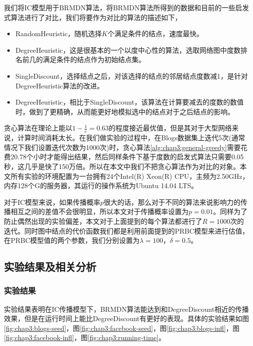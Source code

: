 我们将IC模型用于BRMDN算法，将BRMDN算法所得到的数据和目前的一些启发式算法进行了对比，我们将要作为对比的算法的描述如下，
\begin{itemize}
\item RandomHeuristic，随机选择$K$个满足条件的结点，速度最快。
\item DegreeHeuristic，这是很基本的一个以度中心性的算法，选取网络图中度数排名前几的满足条件的结点作为初始结点集。
\item SingleDiscount，选择结点之后，对该选择的结点的邻居结点度数减1，是针对DegreeHeuristic算法的改进。
\item DegreeHeuristic，相比于SingleDiscount，该算法在计算要减去的度数的数值时，做到了更精确，从而能更好地模拟选中的结点对于之后结点的影响。
\end{itemize}


贪心算法在理论上能以$1-\frac{1}{e}=0.63$的程度接近最优值，但是其对于大型网络来说，计算时间消耗太长。在我们做实验的过程中，在Blogs数据集上迭代5次(通常情况下我们设置迭代次数为1000次)时，贪心算法\ref{alg:chap3:general-greedy}需要花费20.78个小时才能得出结果，然后同样条件下基于度数的启发式算法只需要0.05秒，这几乎是快了150万倍。所以在本文中我们不把贪心算法作为对比的对象。本文所有实验的环境配置为一台拥有24个Intel(R) Xeon(R) CPU，主频为2.50GHz，内存128个G的服务器，其运行的操作系统为Ubuntu 14.04 LTS。

对于IC模型来说，如果传播概率$p$很大的话，那么对于不同的算法来说影响力的传播相互之间的差值不会很明显，所以本文对于传播概率设置为$p=0.01$。同样为了防止偶然出现的实验偏差，本文对于上面提到的每个算法都进行了$R=1000$次的迭代。同时图中结点的代价函数我们都是利用前面提到的PRBC模型来进行估值，在PRBC模型值的两个参数，我们分别设置为$\lambda=100$，$\delta=0.5$。


\subsection{实验结果及相关分析}
\subsubsection{实验结果}
实验结果表明在IC传播模型下，BRMDN算法能达到和DegreeDiscount相近的传播效果，但是在运行时间上能比DegreeDiscount有更好的表现。具体的实验结果如图\ref{fig:chap3:blogs-seed}，图\ref{fig:chap3:facebook-seed}，图\ref{fig:chap3:blogs-infl}，图\ref{fig:chap3:facebook-infl}，图\ref{fig:chap3:running-time}。


